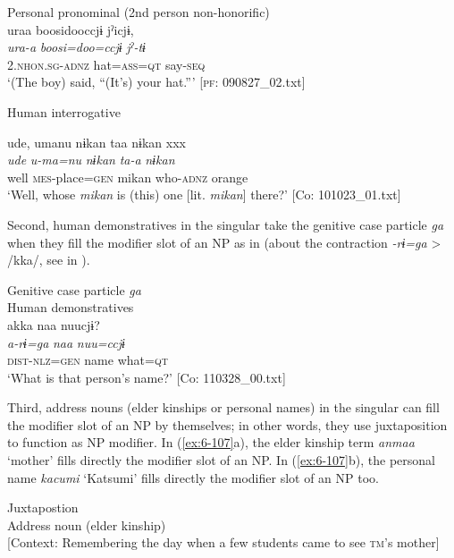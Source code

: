\ex Personal pronominal (2nd person non-honorific)\\
{\TM}
\glll  uraa  {\textbar}boosi{\textbar}dooccjɨ  jˀicjɨ,\\
\textit{ura-a}  \textit{boosi=doo=ccjɨ}  \textit{jˀ-tɨ}\\
2.\textsc{nhon}.\textsc{sg}-\textsc{adnz}  hat=\textsc{ass}=\textsc{qt}  say-\textsc{seq}\\
\glt ‘(The boy) said, “(It’s) your hat.”’ [\textsc{pf}: 090827\_02.txt]

\ex  Human interrogative

{\TM}
\glll ude,  umanu  nɨkan  taa  nɨkan  xxx\\
      \textit{ude}  \textit{u-ma=nu}  \textit{nɨkan}  \textit{ta-a}  \textit{nɨkan}  \\
      well  \textsc{mes}-place=\textsc{gen}  mikan  who-\textsc{adnz}  orange\\
\glt ‘Well, whose \textit{mikan} is (this) one [lit. \textit{mikan}] there?’ [Co: 101023\_01.txt]
\z
\z

  Second, human demonstratives in the singular take the genitive case particle \textit{ga} when they fill the modifier slot of an NP as in  (about the contraction \textit{-rɨ=ga} > /kka/, see  in ).

\ea\label{ex:6-106}
  Genitive case particle \textit{ga}\\
  Human demonstratives\\

  {\TM}
\glll akka  naa  nuucjɨ?\\
\textit{a-rɨ=ga}  \textit{naa}  \textit{nuu=ccjɨ}\\
    \textsc{dist}-\textsc{nlz}=\textsc{gen}  name  what=\textsc{qt}\\
\glt    ‘What is that person’s name?’ [Co: 110328\_00.txt]
\z

  Third, address nouns (elder kinships or personal names) in the singular can fill the modifier slot of an NP by themselves; in other words, they use juxtaposition to function as NP modifier. In (\ref{ex:6-107}a), the elder kinship term \textit{anmaa} ‘mother’ fills directly the modifier slot of an NP. In (\ref{ex:6-107}b), the personal name \textit{kacumi} ‘Katsumi’ fills directly the modifier slot of an NP too.

\ea\label{ex:6-107}
 Juxtapostion\\

 \ea Address noun (elder kinship)\\{}
[Context: Remembering the day when a few students came to see \textsc{tm}’s mother]

